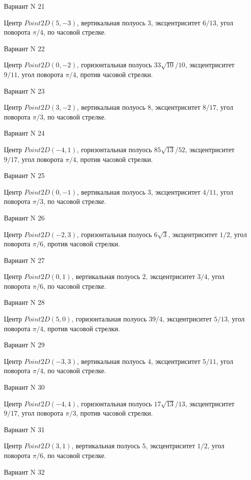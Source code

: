 \documentclass[11pt]{report}
\begin{document}
Вариант N 21

Центр $Point2D\left(5, -3\right)$, вертикальная полуось $3$, эксцентриситет $6 / 13$, угол поворота $\pi / 4$, по часовой стрелке.

Вариант N 22

Центр $Point2D\left(0, -2\right)$, горизонтальная полуось $33 \sqrt{10} / 10$, эксцентриситет $9 / 11$, угол поворота $\pi / 4$, против часовой стрелки.

Вариант N 23

Центр $Point2D\left(3, -2\right)$, вертикальная полуось $8$, эксцентриситет $8 / 17$, угол поворота $\pi / 3$, по часовой стрелке.

Вариант N 24

Центр $Point2D\left(-4, 1\right)$, горизонтальная полуось $85 \sqrt{13} / 52$, эксцентриситет $9 / 17$, угол поворота $\pi / 4$, против часовой стрелки.

Вариант N 25

Центр $Point2D\left(0, -1\right)$, вертикальная полуось $3$, эксцентриситет $4 / 11$, угол поворота $\pi / 3$, по часовой стрелке.

Вариант N 26

Центр $Point2D\left(-2, 3\right)$, горизонтальная полуось $6 \sqrt{3}$, эксцентриситет $1 / 2$, угол поворота $\pi / 6$, против часовой стрелки.

Вариант N 27

Центр $Point2D\left(0, 1\right)$, вертикальная полуось $2$, эксцентриситет $3 / 4$, угол поворота $\pi / 6$, по часовой стрелке.

Вариант N 28

Центр $Point2D\left(5, 0\right)$, горизонтальная полуось $39 / 4$, эксцентриситет $5 / 13$, угол поворота $\pi / 4$, против часовой стрелки.

Вариант N 29

Центр $Point2D\left(-3, 3\right)$, вертикальная полуось $4$, эксцентриситет $5 / 11$, угол поворота $\pi / 4$, по часовой стрелке.

Вариант N 30

Центр $Point2D\left(-4, 4\right)$, горизонтальная полуось $17 \sqrt{13} / 13$, эксцентриситет $9 / 17$, угол поворота $\pi / 3$, против часовой стрелки.

Вариант N 31

Центр $Point2D\left(3, 1\right)$, вертикальная полуось $5$, эксцентриситет $1 / 2$, угол поворота $\pi / 6$, по часовой стрелке.

Вариант N 32
\end{document}
